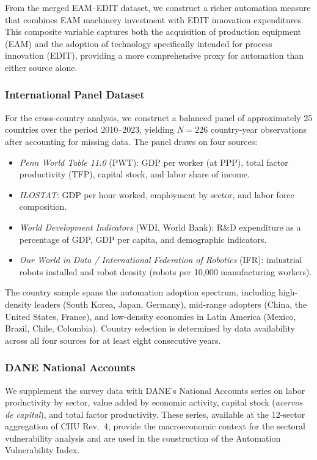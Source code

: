 From the merged EAM--EDIT dataset, we construct a richer automation measure that combines EAM machinery investment with EDIT innovation expenditures. This composite variable captures both the acquisition of production equipment (EAM) and the adoption of technology specifically intended for process innovation (EDIT), providing a more comprehensive proxy for automation than either source alone.

\subsubsection*{International Panel Dataset}

For the cross-country analysis, we construct a balanced panel of approximately 25 countries over the period 2010--2023, yielding $N = 226$ country-year observations after accounting for missing data. The panel draws on four sources:

\begin{itemize}[nosep]
\item \textit{Penn World Table 11.0} (PWT): GDP per worker (at PPP), total factor productivity (TFP), capital stock, and labor share of income.
\item \textit{ILOSTAT}: GDP per hour worked, employment by sector, and labor force composition.
\item \textit{World Development Indicators} (WDI, World Bank): R\&D expenditure as a percentage of GDP, GDP per capita, and demographic indicators.
\item \textit{Our World in Data / International Federation of Robotics} (IFR): industrial robots installed and robot density (robots per 10,000 manufacturing workers).
\end{itemize}

The country sample spans the automation adoption spectrum, including high-density leaders (South Korea, Japan, Germany), mid-range adopters (China, the United States, France), and low-density economies in Latin America (Mexico, Brazil, Chile, Colombia). Country selection is determined by data availability across all four sources for at least eight consecutive years.

\subsubsection*{DANE National Accounts}

We supplement the survey data with DANE's National Accounts series on labor productivity by sector, value added by economic activity, capital stock (\textit{acervos de capital}), and total factor productivity. These series, available at the 12-sector aggregation of CIIU Rev.\ 4, provide the macroeconomic context for the sectoral vulnerability analysis and are used in the construction of the Automation Vulnerability Index.


